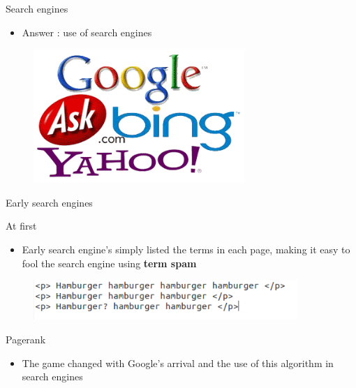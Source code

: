 \documentclass[10pt]{beamer}
\begin{document}
\begin{frame}{Search engines}
\begin{itemize}
\item Answer : use of search engines

\end{itemize}
\begin{figure}
	\includegraphics[width = 8cm]{searchengines.png}
\end{figure}
\end{frame}
\begin{frame}{Early search engines}
\begin{block}{At first}
\begin{itemize}
\item Early search engine's simply listed the terms in each page, making it easy to fool the search engine using \textbf{term spam}

\end{itemize}
\end{block}
\begin{figure}
	\includegraphics[width = 10cm]{termspam.png}
\end{figure}
\begin{block}{Pagerank}
\begin{itemize}
\item The game changed with Google's arrival and the use of this algorithm in search engines
\end{itemize}
\end{block}
\end{frame}
\end{document}
